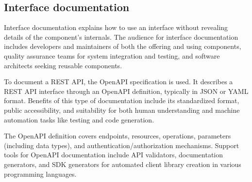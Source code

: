\subsection*{Interface documentation}
Interface documentation explains how to use an interface without revealing details of the component's internals. 
The audience for interface documentation includes developers and maintainers of both the offering and using components, quality assurance teams for system integration and testing, and software architects seeking reusable components.

To document a REST API, the OpenAPI specification is used.
It describes a REST API interface through an OpenAPI definition, typically in JSON or YAML format.
Benefits of this type of documentation include its standardized format, public accessibility, and suitability for both human understanding and machine automation tasks like testing and code generation.

The OpenAPI definition covers endpoints, resources, operations, parameters (including data types), and authentication/authorization mechanisms. 
Support tools for OpenAPI documentation include API validators, documentation generators, and SDK generators for automated client library creation in various programming languages.